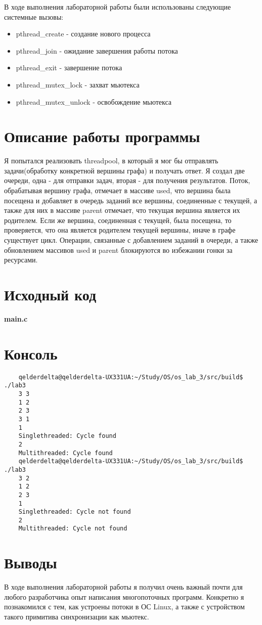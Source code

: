 \documentclass[a4paper, 12pt]{article}
\begin{document}
В ходе выполнения лабораторной работы были использованы следующие системные вызовы:

\begin{itemize}
	\item pthread\_create - создание нового процесса
	\item pthread\_join - ожидание завершения работы потока
	\item pthread\_exit - завершение потока
	\item pthread\_mutex\_lock - захват мьютекса
	\item pthread\_mutex\_unlock - освобождение мьютекса
\end{itemize}
\section{Описание работы программы}

Я попытался реализовать threadpool, в который я мог бы отправлять задачи(обработку конкретной вершины графа) и получать ответ. Я создал две очереди, одна - для отправки задач, вторая - для получения результатов. Поток, обрабатывая вершину графа, отмечает в массиве used, что вершина была посещена и добавляет в очередь заданий все вершины, соединенные с текущей, а также для них в массиве parent отмечает, что текущая вершина является их родителем. Если же вершина, соединенная с текущей, была посещена, то проверяется, что она является родителем текущей вершины, иначе в графе существует цикл. Операции, связанные с добавлением заданий в очереди, а также обновлением массивов used и parent блокируются во избежании гонки за ресурсами.

\newpage

\section{Исходный код}



\textbf{\large{main.c}}

\newpage
\section{Консоль}

\begin{verbatim}
	qelderdelta@qelderdelta-UX331UA:~/Study/OS/os_lab_3/src/build$ ./lab3
	3 3
	1 2
	2 3
	3 1
	1
	Singlethreaded: Cycle found
	2
	Multithreaded: Cycle found
	qelderdelta@qelderdelta-UX331UA:~/Study/OS/os_lab_3/src/build$ ./lab3
	3 2
	1 2
	2 3
	1
	Singlethreaded: Cycle not found
	2
	Multithreaded: Cycle not found                       
\end{verbatim}
\newpage
\section{Выводы}

В ходе выполнения лабораторной работы я получил очень важный почти для любого разработчика опыт написания многопоточных программ. Конкретно я познакомился с тем, как устроены потоки в ОС Linux, а также с устройством такого примитива синхронизации как мьютекс.
\end{document}
